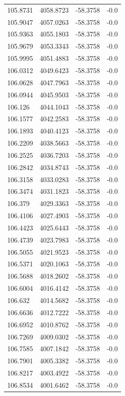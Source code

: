 \begin{table}[H]
\begin{tabular}{llll}
105.8731 & 4058.8723 & -58.3758 & -0.0 \\
105.9047 & 4057.0263 & -58.3758 & -0.0 \\
105.9363 & 4055.1803 & -58.3758 & -0.0 \\
105.9679 & 4053.3343 & -58.3758 & -0.0 \\
105.9995 & 4051.4883 & -58.3758 & -0.0 \\
106.0312 & 4049.6423 & -58.3758 & -0.0 \\
106.0628 & 4047.7963 & -58.3758 & -0.0 \\
106.0944 & 4045.9503 & -58.3758 & -0.0 \\
106.126 & 4044.1043 & -58.3758 & -0.0 \\
106.1577 & 4042.2583 & -58.3758 & -0.0 \\
106.1893 & 4040.4123 & -58.3758 & -0.0 \\
106.2209 & 4038.5663 & -58.3758 & -0.0 \\
106.2525 & 4036.7203 & -58.3758 & -0.0 \\
106.2842 & 4034.8743 & -58.3758 & -0.0 \\
106.3158 & 4033.0283 & -58.3758 & -0.0 \\
106.3474 & 4031.1823 & -58.3758 & -0.0 \\
106.379 & 4029.3363 & -58.3758 & -0.0 \\
106.4106 & 4027.4903 & -58.3758 & -0.0 \\
106.4423 & 4025.6443 & -58.3758 & -0.0 \\
106.4739 & 4023.7983 & -58.3758 & -0.0 \\
106.5055 & 4021.9523 & -58.3758 & -0.0 \\
106.5371 & 4020.1063 & -58.3758 & -0.0 \\
106.5688 & 4018.2602 & -58.3758 & -0.0 \\
106.6004 & 4016.4142 & -58.3758 & -0.0 \\
106.632 & 4014.5682 & -58.3758 & -0.0 \\
106.6636 & 4012.7222 & -58.3758 & -0.0 \\
106.6952 & 4010.8762 & -58.3758 & -0.0 \\
106.7269 & 4009.0302 & -58.3758 & -0.0 \\
106.7585 & 4007.1842 & -58.3758 & -0.0 \\
106.7901 & 4005.3382 & -58.3758 & -0.0 \\
106.8217 & 4003.4922 & -58.3758 & -0.0 \\
106.8534 & 4001.6462 & -58.3758 & -0.0 \\

\end{tabular}
\end{table}
